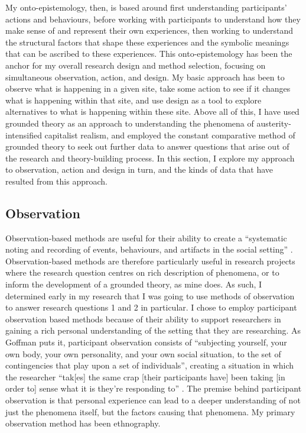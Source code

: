 My onto-epistemology, then, is based around first understanding participants' actions and behaviours, before working with participants to understand how they make sense of and represent their own experiences, then working to understand the structural factors that shape these experiences and the symbolic meanings that can be ascribed to these experiences. This onto-epistemology has been the anchor for my overall research design and method selection, focusing on simultaneous observation, action, and design. My basic approach has been to observe what is happening in a given site, take some action to see if it changes what is happening within that site, and use design as a tool to explore alternatives to what is happening within these site. Above all of this, I have used grounded theory as an approach to understanding the phenomena of austerity-intensified capitalist realism, and employed the constant comparative method of grounded theory to seek out further data to answer questions that arise out of the research and theory-building process. In this section, I explore my approach to observation, action and design in turn, and the kinds of data that have resulted from this approach. 

\subsection{Observation}
\label{3-2-1-observation}
Observation-based methods are useful for their ability to create a “systematic noting and recording of events, behaviours, and artifacts in the social setting” \citep[139]{marshall_designing_2010}. Observation-based methods are therefore particularly useful in research projects where the research question centres on rich description of phenomena, or to inform the development of a grounded theory, as mine does. As such, I determined early in my research that I was going to use methods of observation to answer research questions 1 and 2 in particular. I chose to employ participant observation based methods because of their ability to support researchers in gaining a rich personal understanding of the setting that they are researching. As Goffman puts it, participant observation consists of “subjecting yourself, your own body, your own personality, and your own social situation, to the set of contingencies that play upon a set of individuals”, creating a situation in which the researcher “tak[es] the same crap [their participants have] been taking [in order to] sense what it is they’re responding to”  \citep{goffman_fieldwork_1989}. The premise behind participant observation is that personal experience can lead to a deeper understanding of not just the phenomena itself, but the factors causing that phenomena. My primary observation method has been ethnography. 


